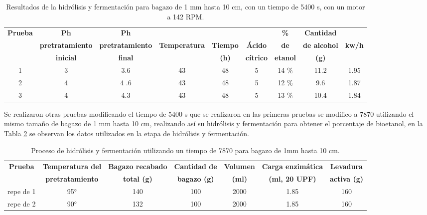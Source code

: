 \documentclass[12pt]{article}
\begin{document}
	\begin{table}[h!]
		\centering
		\caption{Resultados de la hidrólisis y fermentación para bagazo de 1 mm hasta 10 cm, con un tiempo de 5400 s, con un motor a 142 RPM.}
		\label{hidrolisis alcalino varios_parte2}
		\resizebox{16cm}{!} {
			\begin{tabular}{|c|c|c|c|c|c|c|c|c|}
				\hline
				\textbf{Prueba}	& \textbf{Ph}& \textbf{Ph} &  &  &  &\textbf{\%} & \textbf{Cantidad} & \\
				&	\textbf{pretratamiento} & 	\textbf{pretratamiento} & \textbf{Temperatura} & \textbf{Tiempo} & \textbf{Ácido} & \textbf{de } & \textbf{de alcohol } & \textbf{kw/h} \\
				&	\textbf{inicial}& \textbf{final} &  &\textbf{(h)}  & \textbf{cítrico} & \textbf{etanol }& \textbf{(g) }& \\ \hline		
				1	    &3  & 3.6 & 43& 48 & 5 & 14 \% &11.2 & 1.95\\ \hline
				
				2   	&4  &4 .6 & 43& 48 & 5 & 12 \%  &9.6 &1.87  \\ \hline
				
				3	&4  & 4.3 & 43 & 48 & 5 & 13 \%  &10.4& 1.84\\ \hline
				
		\end{tabular} }
		
	\end{table}
	
	
	
	
	Se realizaron otras pruebas modificando el tiempo de 5400 s que se realizaron en las primeras pruebas se modifico a 7870 utilizando el mismo tamaño de bagazo de 1 mm hasta 10 cm, realizando así su hidrólisis y fermentación para obtener el porcentaje de bioetanol, en la Tabla \ref{hidrolisis alcalino varios_7870}  se observan los datos utilizados en la etapa de hidrólisis y fermentación.
	
		\begin{table}[H]
		\centering
		\caption{Proceso de hidrólisis y fermentación utilizando un tiempo de 7870 para bagazo de 1mm hasta 10 cm.}
		\label{hidrolisis alcalino varios_7870}
		\resizebox{16cm}{!} {
			\begin{tabular}{|c|c|c|c|c|c|c|}
				\hline
				\textbf{Prueba}	& \textbf{Temperatura del} & \textbf{Bagazo recabado} & \textbf{Cantidad de} & \textbf{Volumen} & \textbf{Carga enzimática} & \textbf{Levadura} \\
				&	\textbf{pretratamiento} & \textbf{total (g)} & \textbf{bagazo (g)} & \textbf{(ml)} & \textbf{(ml, 20 UPF)} & \textbf{activa (g)} \\ \hline		

				repe de 1&	95° & 140 & 100 & 2000 & 1.85 & 160 \\ \hline

				repe de 2	&	90° & 132 & 100 & 2000 & 1.85 & 160 \\ \hline

				
		\end{tabular} }
		
	\end{table}
	
\end{document}
